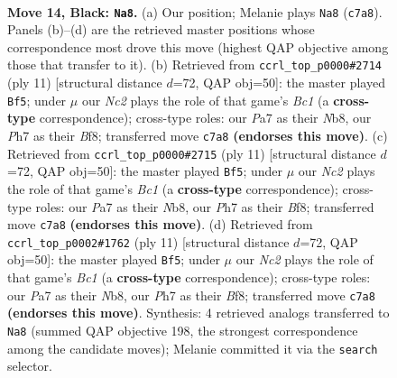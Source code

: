 \documentclass[11pt]{article}
\begin{document}
\clearpage

\begin{figure}[p]\centering
\begin{subfigure}{0.46\textwidth}\centering
\resizebox{\linewidth}{!}{%
\newchessgame
\chessboard[
  setfen={1rb2rk1/ppn1npbp/3q2p1/2p1p3/6PP/3PP3/PP3PBK/RNBQNR2 b - - 0 14},
  showmover=false,
  pgfstyle=straightmove, color=movearrow, markmove={c7-a8}
]}
\caption{}
\end{subfigure}\hfill
\begin{subfigure}{0.46\textwidth}\centering
\resizebox{\linewidth}{!}{%
\newchessgame
\chessboard[
  setfen={rnbqkb1r/ppp1pppp/1n6/4P3/3P4/1B6/PP3PPP/RNBQK1NR b KQkq - 2 6},
  showmover=false,
  pgfstyle=straightmove, color=movearrow, markmove={c8-f5}
]}
\caption{}
\end{subfigure}
\\[4pt]
\begin{subfigure}{0.46\textwidth}\centering
\resizebox{\linewidth}{!}{%
\newchessgame
\chessboard[
  setfen={rnbqkb1r/ppp1pppp/1n6/4P3/3P4/1B6/PP3PPP/RNBQK1NR b KQkq - 2 6},
  showmover=false,
  pgfstyle=straightmove, color=movearrow, markmove={c8-f5}
]}
\caption{}
\end{subfigure}\hfill
\begin{subfigure}{0.46\textwidth}\centering
\resizebox{\linewidth}{!}{%
\newchessgame
\chessboard[
  setfen={rnbqkb1r/ppp1pppp/1n6/4P3/3P4/1B6/PP3PPP/RNBQK1NR b KQkq - 2 6},
  showmover=false,
  pgfstyle=straightmove, color=movearrow, markmove={c8-f5}
]}
\caption{}
\end{subfigure}
\caption{\textbf{Move 14, Black: \texttt{Na8}.} (a) Our position; Melanie plays \texttt{Na8} (\texttt{c7a8}). Panels (b)--(d) are the retrieved master positions whose correspondence most drove this move (highest QAP objective among those that transfer to it). (b) Retrieved from \texttt{ccrl\_top\_p0000\#2714} (ply 11) [structural distance $d$=72, QAP obj=50]: the master played \texttt{Bf5}; under $\mu$ our \emph{Nc2} plays the role of that game's \emph{Bc1} (a \textbf{cross-type} correspondence); cross-type roles: our \emph{P}a7 as their \emph{N}b8, our \emph{P}h7 as their \emph{B}f8; transferred move \texttt{c7a8} \textbf{(endorses this move)}. (c) Retrieved from \texttt{ccrl\_top\_p0000\#2715} (ply 11) [structural distance $d$=72, QAP obj=50]: the master played \texttt{Bf5}; under $\mu$ our \emph{Nc2} plays the role of that game's \emph{Bc1} (a \textbf{cross-type} correspondence); cross-type roles: our \emph{P}a7 as their \emph{N}b8, our \emph{P}h7 as their \emph{B}f8; transferred move \texttt{c7a8} \textbf{(endorses this move)}. (d) Retrieved from \texttt{ccrl\_top\_p0002\#1762} (ply 11) [structural distance $d$=72, QAP obj=50]: the master played \texttt{Bf5}; under $\mu$ our \emph{Nc2} plays the role of that game's \emph{Bc1} (a \textbf{cross-type} correspondence); cross-type roles: our \emph{P}a7 as their \emph{N}b8, our \emph{P}h7 as their \emph{B}f8; transferred move \texttt{c7a8} \textbf{(endorses this move)}. Synthesis: 4 retrieved analogs transferred to \texttt{Na8} (summed QAP objective 198, the strongest correspondence among the candidate moves); Melanie committed it via the \texttt{search} selector.}
\label{fig:thought-m27}
\end{figure}
\end{document}
